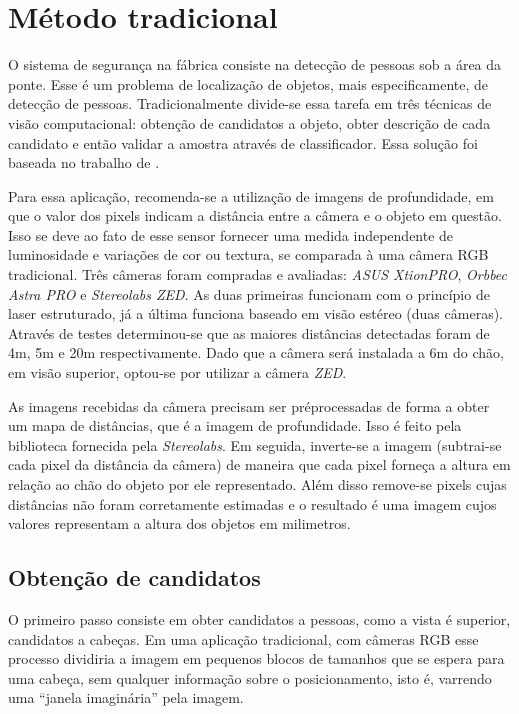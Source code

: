 \chapter{Método tradicional}

O sistema de segurança na fábrica consiste na detecção de pessoas sob a área da ponte. Esse é um problema de localização de objetos, mais especificamente, de detecção de pessoas. Tradicionalmente divide-se essa tarefa em três técnicas de visão computacional: obtenção de candidatos a objeto, obter descrição de cada candidato e então validar a amostra através de classificador. Essa solução foi baseada no trabalho de \cite{rauter}.

Para essa aplicação, recomenda-se a utilização de imagens de profundidade, em que o valor dos pixels indicam a distância entre a câmera e o objeto em questão. Isso se deve ao fato de esse sensor fornecer uma medida independente de luminosidade e variações de cor ou textura, se comparada à uma câmera RGB tradicional. Três câmeras foram compradas e avaliadas: \textit{ASUS XtionPRO}, \textit{Orbbec Astra PRO} e \textit{Stereolabs ZED}. As duas primeiras funcionam com o princípio de laser estruturado, já a última funciona baseado em visão estéreo (duas câmeras). Através de testes determinou-se que as maiores distâncias detectadas foram de 4m, 5m e 20m respectivamente. Dado que a câmera será instalada a 6m do chão, em visão superior, optou-se por utilizar a câmera \textit{ZED}.

As imagens recebidas da câmera precisam ser préprocessadas de forma a obter um mapa de distâncias, que é a imagem de profundidade. Isso é feito pela biblioteca fornecida pela \textit{Stereolabs}. Em seguida, inverte-se a imagem (subtrai-se cada pixel da distância da câmera) de maneira que cada pixel forneça a altura em relação ao chão do objeto por ele representado. Além disso remove-se pixels cujas distâncias não foram corretamente estimadas e o resultado é uma imagem cujos valores representam a altura dos objetos em milimetros.

\section{Obtenção de candidatos}
O primeiro passo consiste em obter candidatos a pessoas, como a vista é superior, candidatos a cabeças. Em uma aplicação tradicional, com câmeras RGB esse processo dividiria a imagem em pequenos blocos de tamanhos que se espera para uma cabeça, sem qualquer informação sobre o posicionamento, isto é, varrendo uma ``janela imaginária'' pela imagem.


